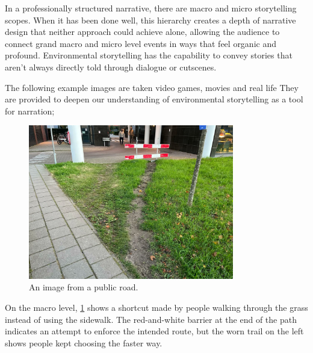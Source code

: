         In a professionally structured narrative, there are macro and micro storytelling scopes\cite{Liminal_Space_Between_Embedded_and_Emergent_Narrative}. When it has been done well, this hierarchy creates a depth of narrative design that neither approach could achieve alone, allowing the audience to connect grand macro and micro level events in ways that feel organic and profound\cite{Environmental_Storytelling_Blogpost}. Environmental storytelling has the capability to convey stories that aren’t always directly told through dialogue or cutscenes.\par

        The following example images are taken video games, movies and real life They are provided to deepen our understanding of environmental storytelling as a tool for narration;

        \begin{figure}[H]
        \centering
        \includegraphics[width=0.8\textwidth]{images/environmental_storytelling_02}
        \caption{An image from a public road.}
        \label{fig:ES_01}
        \end{figure}

        On the macro level, \ref{fig:ES_01} shows a shortcut made by people walking through the grass instead of using the sidewalk. The red-and-white barrier at the end of the path indicates an attempt to enforce the intended route, but the worn trail on the left shows people kept choosing the faster way.\par

